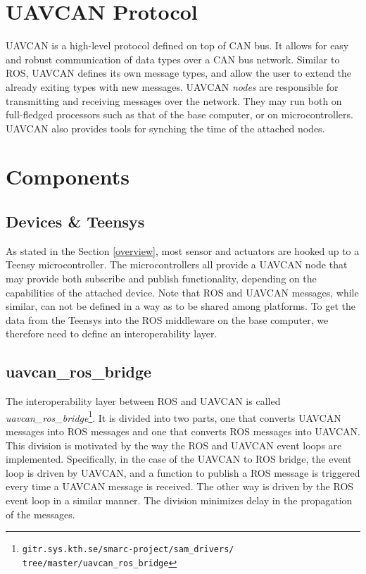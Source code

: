 \documentclass[9pt,technote]{IEEEtran} %
\begin{document}
\section{UAVCAN Protocol}
\label{uavcan}

UAVCAN is a high-level protocol defined on top of CAN bus. It allows for easy and robust
communication of data types over a CAN bus network. Similar to ROS, UAVCAN defines its
own message types, and allow the user to extend the already exiting types with new messages.
UAVCAN \textit{nodes} are responsible for transmitting and receiving messages over the network.
They may run both on full-fledged processors such as that of the base computer, or on microcontrollers.
UAVCAN also provides tools for synching the time of the attached nodes.

\section{Components}
\label{components}

\subsection{Devices \& Teensys}

As stated in the Section \ref{overview}, most sensor and actuators are hooked up to a Teensy microcontroller.
The microcontrollers all provide a UAVCAN node that may provide both subscribe and publish
functionality, depending on the capabilities of the attached device.
Note that ROS and UAVCAN messages, while similar, can not be defined in a way
as to be shared among platforms. To get the data from the Teensys into the ROS middleware
on the base computer, we therefore need to define an interoperability layer.

\subsection{uavcan\_ros\_bridge}

The interoperability layer between ROS and UAVCAN is called \textit{uavcan\_ros\_bridge}\footnote{\texttt{gitr.sys.kth.se/smarc-project/sam\_drivers/\\tree/master/uavcan\_ros\_bridge}}.
It is divided into two parts, one that converts UAVCAN messages into ROS messages and
one that converts ROS messages into UAVCAN. This division is motivated by the way the
ROS and UAVCAN event loops are implemented. Specifically, in the case of the UAVCAN to
ROS bridge, the event loop is driven by UAVCAN, and a function to publish a ROS message
is triggered every time a UAVCAN message is received. The other way is driven by the ROS
event loop in a similar manner. The division minimizes delay in the propagation of the messages.
\end{document}
